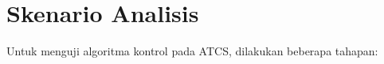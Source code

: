 	


\section{Skenario Analisis}

Untuk menguji algoritma kontrol pada ATCS, dilakukan beberapa tahapan:

